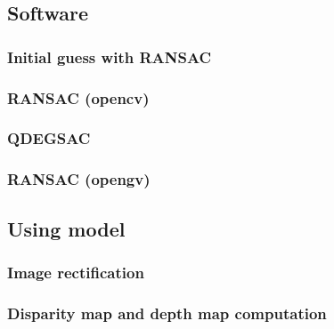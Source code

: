 \documentclass[12pt]{article}
\begin{document}
\subsection{Software}

\subsubsection{Initial guess with RANSAC}
\subsubsection{RANSAC (opencv)}
\subsubsection{QDEGSAC}
\subsubsection{RANSAC (opengv)}
\subsection{Using model}
\subsubsection{Image rectification}
\subsubsection{Disparity map and depth map computation}

\clearpage



\end{document}
